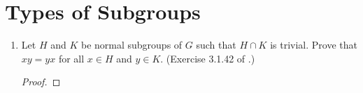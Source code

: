 \documentclass[../psets.tex]{subfiles}
\begin{document}
\section{Types of Subgroups}
\begin{enumerate}
    \item {}Let $H$ and $K$ be normal subgroups of $G$ such that $H\cap K$ is trivial. Prove that $xy=yx$ for all $x\in H$ and $y\in K$. (Exercise 3.1.42 of \textcite{bib:DummitFoote}.)
    \begin{proof}














\end{proof}
\end{enumerate}
\end{document}
